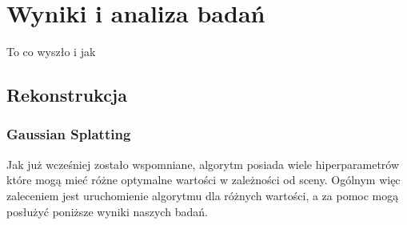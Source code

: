 \section{Wyniki i analiza badań}
To co wyszło i jak

\subsection{Rekonstrukcja}

\subsubsection{Gaussian Splatting}
Jak już wcześniej zostało wspomniane, algorytm posiada wiele hiperparametrów które mogą mieć różne optymalne wartości w zależności od sceny. Ogólnym więc zaleceniem jest uruchomienie algorytmu dla różnych wartości, a za pomoc mogą posłużyć poniższe wyniki naszych badań. 


